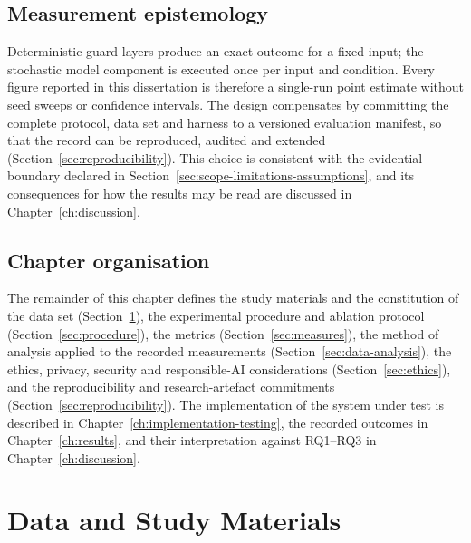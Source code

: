 \subsection*{Measurement epistemology}

Deterministic guard layers produce an exact outcome for a fixed input; the
stochastic model component is executed once per input and condition. Every
figure reported in this dissertation is therefore a single-run point estimate
without seed sweeps or confidence intervals. The design compensates by
committing the complete protocol, data set and harness to a versioned evaluation
manifest, so that the record can be reproduced, audited and extended
(Section~\ref{sec:reproducibility}). This choice is consistent with the
evidential boundary declared in Section~\ref{sec:scope-limitations-assumptions},
and its consequences for how the results may be read are discussed in
Chapter~\ref{ch:discussion}.

\subsection*{Chapter organisation}

The remainder of this chapter defines the study materials and the constitution
of the data set (Section~\ref{sec:data-materials}), the experimental procedure
and ablation protocol (Section~\ref{sec:procedure}), the metrics
(Section~\ref{sec:measures}), the method of analysis applied to the recorded
measurements (Section~\ref{sec:data-analysis}), the ethics, privacy, security
and responsible-AI considerations (Section~\ref{sec:ethics}), and the
reproducibility and research-artefact commitments (Section~\ref{sec:reproducibility}).
The implementation of the system under test is described in
Chapter~\ref{ch:implementation-testing}, the recorded outcomes in
Chapter~\ref{ch:results}, and their interpretation against RQ1--RQ3 in
Chapter~\ref{ch:discussion}.


\section{Data and Study Materials}\label{sec:data-materials}

